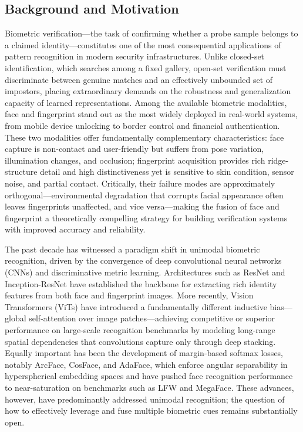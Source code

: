 \documentclass[10pt,journal,compsoc]{IEEEtran}
\begin{document}
\subsection{Background and Motivation}

Biometric verification---the task of confirming whether a probe sample belongs to a claimed identity---constitutes one of the most consequential applications of pattern recognition in modern security infrastructures. Unlike closed-set identification, which searches among a fixed gallery, open-set verification must discriminate between genuine matches and an effectively unbounded set of impostors, placing extraordinary demands on the robustness and generalization capacity of learned representations\cite{deng2019arcface, masood2021deep}. Among the available biometric modalities, face and fingerprint stand out as the most widely deployed in real-world systems, from mobile device unlocking to border control and financial authentication\cite{jain201650}. These two modalities offer fundamentally complementary characteristics: face capture is non-contact and user-friendly but suffers from pose variation, illumination changes, and occlusion; fingerprint acquisition provides rich ridge-structure detail and high distinctiveness yet is sensitive to skin condition, sensor noise, and partial contact. Critically, their failure modes are approximately orthogonal---environmental degradation that corrupts facial appearance often leaves fingerprints unaffected, and vice versa---making the fusion of face and fingerprint a theoretically compelling strategy for building verification systems with improved accuracy and reliability\cite{raghavendra2015robust, mensi2022multi}.

The past decade has witnessed a paradigm shift in unimodal biometric recognition, driven by the convergence of deep convolutional neural networks (CNNs) and discriminative metric learning. Architectures such as ResNet\cite{he2016deep} and Inception-ResNet\cite{szegedy2017inception} have established the backbone for extracting rich identity features from both face\cite{deng2019arcface} and fingerprint\cite{cao2018fingerprint} images. More recently, Vision Transformers (ViTs)\cite{dosovitskiy2021an} have introduced a fundamentally different inductive bias---global self-attention over image patches---achieving competitive or superior performance on large-scale recognition benchmarks by modeling long-range spatial dependencies that convolutions capture only through deep stacking. Equally important has been the development of margin-based softmax losses, notably ArcFace\cite{deng2019arcface}, CosFace\cite{wang2018cosface}, and AdaFace\cite{kim2022adaface}, which enforce angular separability in hyperspherical embedding spaces and have pushed face recognition performance to near-saturation on benchmarks such as LFW\cite{huang2008labeled} and MegaFace\cite{kemelmacher2016megaface}. These advances, however, have predominantly addressed unimodal recognition; the question of how to effectively leverage and fuse multiple biometric cues remains substantially open.
\end{document}
